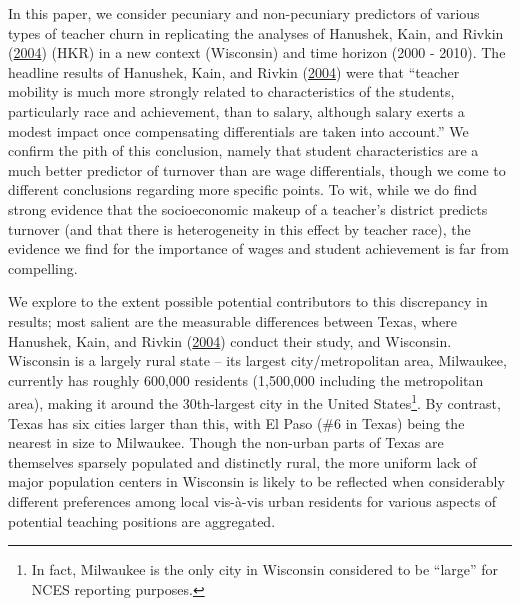 \documentclass[12pt,]{article}
\let\rmarkdownfootnote\footnote%
\def\footnote{\protect\rmarkdownfootnote}
\begin{document}
In this paper, we consider pecuniary and non-pecuniary predictors of
various types of teacher churn in replicating the analyses of Hanushek,
Kain, and Rivkin (\protect\hyperlink{ref-hanushek}{2004}) (HKR) in a new
context (Wisconsin) and time horizon (2000 - 2010). The headline results
of Hanushek, Kain, and Rivkin (\protect\hyperlink{ref-hanushek}{2004})
were that ``teacher mobility is much more strongly related to
characteristics of the students, particularly race and achievement, than
to salary, although salary exerts a modest impact once compensating
differentials are taken into account.'' We confirm the pith of this
conclusion, namely that student characteristics are a much better
predictor of turnover than are wage differentials, though we come to
different conclusions regarding more specific points. To wit, while we
do find strong evidence that the socioeconomic makeup of a teacher's
district predicts turnover (and that there is heterogeneity in this
effect by teacher race), the evidence we find for the importance of
wages and student achievement is far from compelling.

We explore to the extent possible potential contributors to this
discrepancy in results; most salient are the measurable differences
between Texas, where Hanushek, Kain, and Rivkin
(\protect\hyperlink{ref-hanushek}{2004}) conduct their study, and
Wisconsin. Wisconsin is a largely rural state -- its largest
city/metropolitan area, Milwaukee, currently has roughly 600,000
residents (1,500,000 including the metropolitan area), making it around
the 30th-largest city in the United States\footnote{In fact, Milwaukee
  is the only city in Wisconsin considered to be ``large'' for NCES
  reporting purposes.}. By contrast, Texas has six cities larger than
this, with El Paso (\#6 in Texas) being the nearest in size to
Milwaukee. Though the non-urban parts of Texas are themselves sparsely
populated and distinctly rural, the more uniform lack of major
population centers in Wisconsin is likely to be reflected when
considerably different preferences among local vis-à-vis urban residents
for various aspects of potential teaching positions are aggregated.
\end{document}

